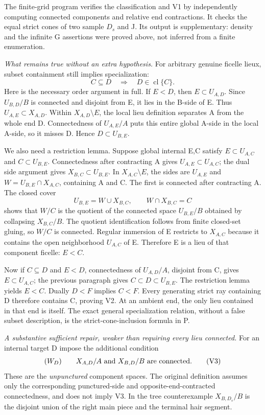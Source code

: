 The finite-grid program verifies the classification and V1 by independently computing connected components and relative end contractions. It checks the equal strict cones of two sample $D_s$ and J. Its output is supplementary: density and the infinite G assertions were proved above, not inferred from a finite enumeration.

\emph{What remains true without an extra hypothesis.}
For arbitrary genuine ficelle lieux, subset containment still implies specialization:
\[
 C\subseteq D\quad\Longrightarrow\quad D\in\operatorname{cl}\{C\}. \tag{V2}
\]
Here is the necessary order argument in full. If $E<D$, then $E\subset U_{A,D}$. Since $U_{B,D}/B$ is connected and disjoint from E, it lies in the B-side of E. Thus $U_{A,E}\subset X_{A,D}$. Within $X_{A,D}\setminus E$, the local lieu definition separates A from the whole end D. Connectedness of $U_{A,E}/A$ puts this entire global A-side in the local A-side, so it misses D. Hence $D\subset U_{B,E}$.

We also need a restriction lemma. Suppose global internal E,C satisfy $E\subset U_{A,C}$ and $C\subset U_{B,E}$. Connectedness after contracting A gives $U_{A,E}\subset U_{A,C}$; the dual side argument gives $X_{B,C}\subset U_{B,E}$. In $X_{A,C}\setminus E$, the sides are $U_{A,E}$ and $W=U_{B,E}\cap X_{A,C}$, containing A and C. The first is connected after contracting A. The closed cover
\[
 U_{B,E}=W\cup X_{B,C},\qquad W\cap X_{B,C}=C
\]
shows that $W/C$ is the quotient of the connected space $U_{B,E}/B$ obtained by collapsing $X_{B,C}/B$. The quotient identification follows from finite closed-set gluing, so $W/C$ is connected. Regular immersion of E restricts to $X_{A,C}$ because it contains the open neighborhood $U_{A,C}$ of E. Therefore E is a lieu of that component ficelle: $E<C$.

Now if $C\subseteq D$ and $E<D$, connectedness of $U_{A,D}/A$, disjoint from C, gives $E\subset U_{A,C}$; the previous paragraph gives $C\subset D\subset U_{B,E}$. The restriction lemma yields $E<C$. Dually $D<F$ implies $C<F$. Every generating strict ray containing D therefore contains C, proving V2. At an ambient end, the only lieu contained in that end is itself. The exact general specialization relation, without a false subset description, is the strict-cone-inclusion formula in P.

\emph{A substantive sufficient repair, weaker than requiring every lieu connected.}
For an internal target D impose the additional condition
\[
 (W_D)\qquad X_{A,D}/A\ \hbox{and}\ X_{B,D}/B\ \hbox{are connected}. \tag{V3}
\]
These are the \emph{unpunctured} component spaces. The original definition assumes only the corresponding punctured-side and opposite-end-contracted connectedness, and does not imply V3. In the tree counterexample $X_{B,D_s}/B$ is the disjoint union of the right main piece and the terminal hair segment.

